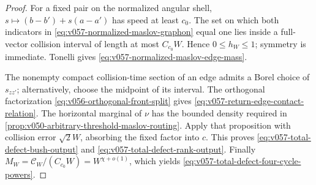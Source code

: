 \documentclass[10pt]{article}
\begin{document}
\begin{proof}
For a fixed pair on the normalized angular shell,
\(s\mapsto(b-b')+s(a-a')\) has speed at least \(c_0\).  The set on which both indicators in
\eqref{eq:v057-normalized-maslov-graphon} equal one lies inside a full-vector collision interval of
length at most \(C_{c_0}W\).  Hence \(0\le h_W\le1\); symmetry is immediate.  Tonelli gives
\eqref{eq:v057-normalized-maslov-edge-mass}.

The nonempty compact collision-time section of an edge admits a Borel choice of
\(s_{zz'}\); alternatively, choose the midpoint of its interval.  The orthogonal factorization
\eqref{eq:v056-orthogonal-front-split} gives
\eqref{eq:v057-return-edge-contact-relation}.  The horizontal marginal of \(\nu\) has the bounded
density required in \cref{prop:v050-arbitrary-threshold-maslov-routing}.  Apply that proposition
with collision error \(\sqrt2W\), absorbing the fixed factor into \(c\).  This proves
\eqref{eq:v057-total-defect-bush-output} and
\eqref{eq:v057-total-defect-rank-output}.  Finally
\(M_W=\mathcal C_W/(C_{c_0}W)=W^{\chi+o(1)}\), which yields
\eqref{eq:v057-total-defect-four-cycle-powers}.
\end{proof}
\end{document}

